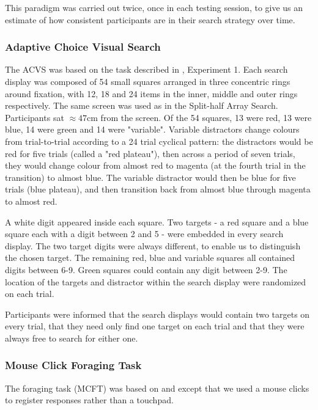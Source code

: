 \documentclass[]{rsos}%
\begin{document}
This paradigm was carried out twice, once in each testing session, to give us an estimate of how consistent participants are in their search strategy over time. 


\subsubsection{Adaptive Choice Visual Search}

The ACVS was based on the task described in \cite{irons-leber2016}, Experiment 1. Each search display was composed of 54 small squares arranged in three concentric rings around fixation, with 12, 18 and 24 items in the inner, middle and outer rings respectively. The same screen was used as in the Split-half Array Search. Participants sat $\approx 47$cm from the screen. Of the 54 squares, 13 were red, 13 were blue, 14 were green and 14 were "variable". Variable distractors change colours from trial-to-trial according to a 24 trial cyclical pattern: the distractors would be red for five trials (called a "red plateau"), then across a period of seven trials, they would change colour from almost red to magenta (at the fourth trial in the transition) to almost blue. The variable distractor would then be blue for five trials (blue plateau), and then transition back from almost blue through magenta to almost red. 

A white digit appeared inside each square. Two targets - a red square and a blue square each with a digit between 2 and 5 - were embedded in every search display. The two target digits were always different, to enable us to distinguish the chosen target. The remaining red, blue and variable squares all contained digits between 6-9. Green squares could contain any digit between 2-9. The location of the targets and distractor within the search display were randomized on each trial.

Participants were informed that the search displays would contain two targets on every trial, that they need only find one target on each trial and that they were always free to search for either one.   

\subsubsection{Mouse Click Foraging Task}

The foraging task (MCFT) was based on \cite{kristjansson2014} and \cite{johannesson2016} except that we used a mouse clicks to register responses rather than a touchpad. 
\end{document}
